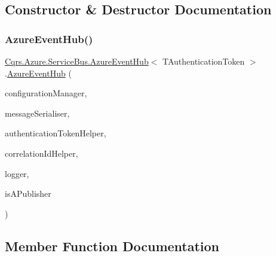 \subsection{Constructor \& Destructor Documentation}
\mbox{\label{classCqrs_1_1Azure_1_1ServiceBus_1_1AzureEventHub_adef2c26639ae4a7725c397da7fd90000}} 
\subsubsection{\texorpdfstring{Azure\+Event\+Hub()}{AzureEventHub()}}
{\footnotesize\ttfamily \hyperlink{classCqrs_1_1Azure_1_1ServiceBus_1_1AzureEventHub}{Cqrs.\+Azure.\+Service\+Bus.\+Azure\+Event\+Hub}$<$ T\+Authentication\+Token $>$.\hyperlink{classCqrs_1_1Azure_1_1ServiceBus_1_1AzureEventHub}{Azure\+Event\+Hub} (\begin{DoxyParamCaption}\item[{\hyperlink{interfaceCqrs_1_1Configuration_1_1IConfigurationManager}{I\+Configuration\+Manager}}]{configuration\+Manager,  }\item[{\hyperlink{interfaceCqrs_1_1Azure_1_1ServiceBus_1_1IMessageSerialiser}{I\+Message\+Serialiser}$<$ T\+Authentication\+Token $>$}]{message\+Serialiser,  }\item[{\hyperlink{interfaceCqrs_1_1Authentication_1_1IAuthenticationTokenHelper}{I\+Authentication\+Token\+Helper}$<$ T\+Authentication\+Token $>$}]{authentication\+Token\+Helper,  }\item[{I\+Correlation\+Id\+Helper}]{correlation\+Id\+Helper,  }\item[{I\+Logger}]{logger,  }\item[{bool}]{is\+A\+Publisher }\end{DoxyParamCaption})\hspace{0.3cm}{\ttfamily [protected]}}



\subsection{Member Function Documentation}
\mbox{\label{classCqrs_1_1Azure_1_1ServiceBus_1_1AzureEventHub_af2efc497815828b6fe0b4d6621bc8b41}} 
